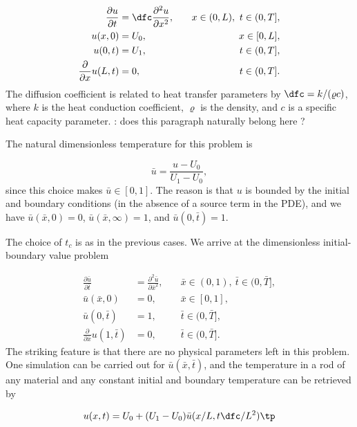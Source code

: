 \documentclass[graybox,envcountchap,sectrefs,final]{svmonodo}
\newcommand{\shortinlinecomment}[3]{{\color{red}{\bf #1}: #2}}
\begin{document}
\begin{align}
\frac{\partial u}{\partial t} &=
\dfc \frac{\partial^2 u}{\partial x^2},
\quad &  x\in (0,L),\ t\in (0, T],
\label{scale:heat:pde3}\\ 
u(x,0) &= U_0,
\quad & x\in [0,L],
\label{scale:heat:pde3:ic:u}\\ 
u(0, t) & = U_1,
\quad  & t\in (0, T],
\label{scale:heat:pde3:bc:0}\\ 
\frac{\partial}{\partial x} u(L, t) & = 0,
\quad & t\in (0, T].
\label{scale:heat:pde3:bc:L}
\end{align}
The diffusion coefficient is related to heat transfer parameters
by $\dfc = k/(\varrho c)$, where $k$ is the heat conduction coefficient,
$\varrho$ is the density, and $c$ is a specific heat capacity parameter.
\shortinlinecomment{Geir 4}{ does this paragraph naturally belong here ? }{ does this paragraph naturally }

The natural dimensionless temperature for this problem is

\[ \bar u = \frac{u - U_0}{U_1 - U_0},\]
since this choice makes $\bar u\in [0,1]$. The reason is that $u$ is bounded by
the initial and boundary conditions (in the absence of a source term in
the PDE),
and we have
$\bar u(\bar x,0)=0$, $\bar u(\bar x,\infty)=1$, and $
\bar u(0,\bar t)=1$.

The choice of $t_c$ is as in the previous cases. We arrive at
the dimensionless initial-boundary value problem

\begin{align}
\frac{\partial \bar u}{\partial \bar t} &=
\frac{\partial^2 \bar u}{\partial \bar x^2},
\quad &  \bar x\in (0,1),\ \bar t\in (0, \bar T],
\label{scale:heat:pde3:d}\\ 
\bar u(\bar x,0) &= 0,
\quad & \bar x\in [0,1],
\label{scale:heat:pde3:ic:u:d}\\ 
\bar u(0, \bar t) & = 1,
\quad  & \bar t\in (0, \bar T],
\label{scale:heat:pde3:bc:0:d}\\ 
\frac{\partial}{\partial \bar x} u(1, \bar t) & = 0,
\quad & \bar t\in (0, \bar T].
\label{scale:heat:pde3:bc:L:d}
\end{align}
The striking feature is that there are no physical parameters left in
this problem. One simulation can be carried out for $\bar u(\bar x,\bar t)$,
and the temperature in a rod of any material and any constant initial and
boundary temperature can be retrieved by

\[ u(x,t) = U_0 + (U_1-U_0)\bar u(x/L, t\dfc/L^2)\tp\]
\end{document}
